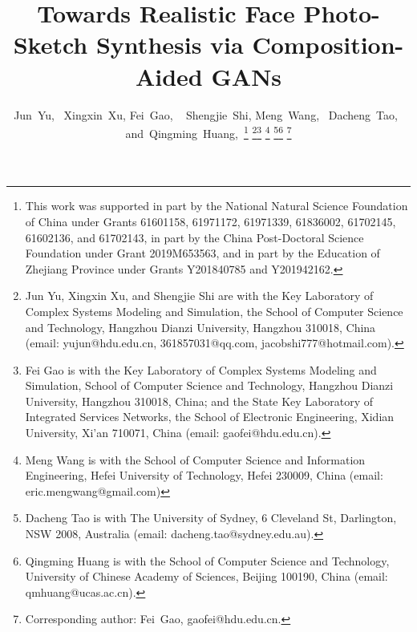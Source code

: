 \documentclass[journal]{IEEEtran}
\begin{document}
\title{Towards Realistic Face Photo-Sketch Synthesis via Composition-Aided GANs}


\author{Jun~Yu,~
		Xingxin~Xu, 
        Fei~Gao, ~
        Shengjie~Shi, 
        Meng~Wang,~
        Dacheng~Tao,~
        and~Qingming~Huang,~\thanks{This work was supported in part by the National Natural Science Foundation of China under Grants 61601158, 61971172, 61971339, 61836002, 61702145, 61602136, and 61702143, in part by the China Post-Doctoral Science Foundation under Grant 2019M653563, and in part by the Education of Zhejiang Province under Grants Y201840785 and Y201942162.}
\thanks{Jun Yu, Xingxin Xu, and Shengjie Shi are with the Key Laboratory of Complex Systems Modeling and Simulation, the School of Computer Science and Technology, Hangzhou Dianzi University, 
Hangzhou 310018, China (email: yujun@hdu.edu.cn, 361857031@qq.com, jacobshi777@hotmail.com).}\thanks{Fei Gao is with the Key Laboratory of Complex Systems Modeling and Simulation, School of Computer Science and Technology, Hangzhou Dianzi University, Hangzhou 310018, China; and the State Key Laboratory of Integrated Services Networks, the School of Electronic Engineering, Xidian University, Xi'an 710071, China (email: gaofei@hdu.edu.cn).}
\thanks{Meng Wang is with the School of Computer Science and Information Engineering, Hefei University of Technology, Hefei 230009, China (email: eric.mengwang@gmail.com)}
\thanks{Dacheng Tao is with The University of Sydney, 6 Cleveland St, Darlington, NSW 2008, Australia (email: dacheng.tao@sydney.edu.au).}\thanks{Qingming Huang is with the School of Computer Science and Technology, University of Chinese Academy of Sciences, Beijing 100190, China (email: qmhuang@ucas.ac.cn).}
\thanks{ Corresponding author: Fei~Gao, gaofei@hdu.edu.cn.}}




















\maketitle
\end{document}
